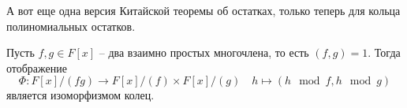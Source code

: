 А вот еще одна версия Китайской теоремы об остатках, только теперь для кольца полиномиальных остатков.

\begin{claim}
\label{claim::ChinesePoly}
Пусть $f, g\in F[x]$ -- два взаимно простых многочлена, то есть $(f, g) = 1$.
Тогда отображение
\[
\Phi\colon F[x]/(fg) \to F[x]/(f)\times F[x]/(g)\quad h \mapsto (h\!\!\mod{f},h\!\!\mod{g})
\]
является изоморфизмом колец.
\end{claim}
